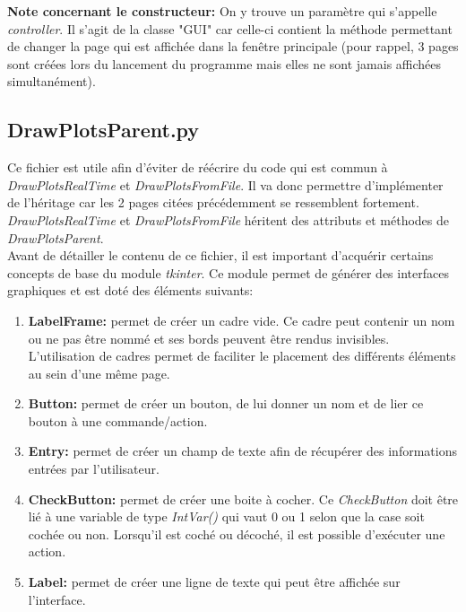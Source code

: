 \textbf{Note concernant le constructeur:} On y trouve un paramètre qui s'appelle \textit{controller}. Il s'agit de la classe "GUI" car celle-ci contient la méthode permettant de changer la page qui est affichée dans la fenêtre principale (pour rappel, 3 pages sont créées lors du lancement du programme mais elles ne sont jamais affichées simultanément).


\subsection{DrawPlotsParent.py}

Ce fichier est utile afin d'éviter de réécrire du code qui est commun à \textit{DrawPlotsRealTime} et \textit{DrawPlotsFromFile}. Il va donc permettre d'implémenter de l'héritage car les 2 pages citées précédemment se ressemblent fortement. \textit{DrawPlotsRealTime} et \textit{DrawPlotsFromFile} héritent des attributs et méthodes de \textit{DrawPlotsParent}.\\

Avant de détailler le contenu de ce fichier, il est important d'acquérir certains concepts de base du module \textit{tkinter}. Ce module permet de générer des interfaces graphiques et est doté des éléments suivants:

\begin{enumerate}
    \item \textbf{LabelFrame:} permet de créer un cadre vide. Ce cadre peut contenir un nom ou ne pas être nommé et ses bords peuvent être rendus invisibles. L'utilisation de cadres permet de faciliter le placement des différents éléments au sein d'une même page.
    
    \item \textbf{Button:} permet de créer un bouton, de lui donner un nom et de lier ce bouton à une commande/action.
    
    \item \textbf{Entry:} permet de créer un champ de texte afin de récupérer des informations entrées par l'utilisateur.
    
    \item \textbf{CheckButton:} permet de créer une boite à cocher. Ce \textit{CheckButton} doit être lié à une variable de type \textit{IntVar()} qui vaut 0 ou 1 selon que la case soit cochée ou non. Lorsqu'il est coché ou décoché, il est possible d'exécuter une action.
    
    \item \textbf{Label:} permet de créer une ligne de texte qui peut être affichée sur l'interface.\\
\end{enumerate}

